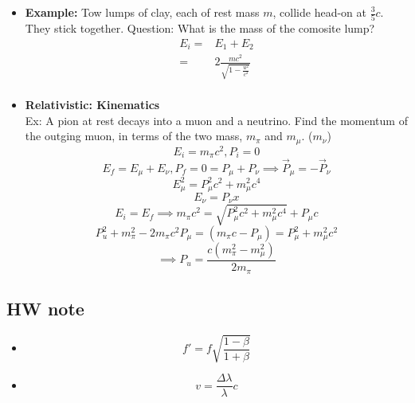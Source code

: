 \documentclass[fleqn,a4paper,12pt]{article}
\begin{document}
\begin{itemize}
  \item
    \textbf{Example:}
    Tow lumps of clay, each of rest mass $m$, collide head-on at $\frac{3}{5}c$. They stick together. 
    Question: What is the mass of the comosite lump?
    \begin{align*}
      E_i =& E_1 + E_2\\
      =& 2 \frac{ mc^2 }{ \sqrt{ 1 - \frac{u^2}{c^2} } } \\
    \end{align*}

  \item
    \textbf{Relativistic: Kinematics}\\
    Ex: A pion at rest decays into a muon and a neutrino.
    Find the momentum of the outging muon, in terms of the two mass, $m_{\pi}$ and $m_{\mu}$. ($m_{\nu}$)\\
    \[E_i=m_{\pi} c^2,P_i = 0\]
    \[E_f = E_{\mu} + E_{\nu}, P_f = 0 = P_{\mu} + P_{\nu} \implies \overrightarrow{P}_{\mu} = - \overrightarrow{P}_{\nu}  \]
  \[E_{\mu}^2 = P_{\mu}^2c^2+m_{\mu}^2c^4 \]
  \[ E_{\nu} = P_{\nu} x \]
  \[ E_i = E_f \implies m_{\pi}c^2 = \sqrt{ P_{\mu}^2c^2 + m_{\mu}^2c^4 } + P_{\mu}c \]
  \[ P_u^2 + m_{\pi}^2 -2m_{\pi}c^2P_{\mu} = ( m_{\pi}c - P_{\mu} ) = P_{\mu}^2 + m_{\mu}^2 c^2\]
  \[ \implies P_u = \frac{ c ( m_{\pi}^2 - m_{\mu}^2 ) }{ 2 m_{\pi} } \]

\end{itemize}




\subsection{HW note}
\begin{itemize}
  \item
    \[  f' = f \sqrt{ \frac{ 1 - \beta }{ 1 + \beta } } \]
  \item
    \[ v = \frac {\Delta \lambda }{ \lambda } c\]
    

\end{itemize}
\end{document}
